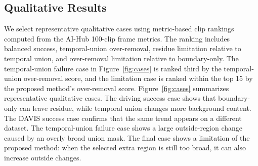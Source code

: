\documentclass[nouppercase]{kaia}
\begin{document}
\begin{table}[h]
\begin{center}
\end{center}
\caption{Computational cost and practicality. The proposed method is a training-free, model-agnostic preprocessing step and does not require depth, optical flow, or model modification at inference time.}
\label{tab:cost}
\end{table}

\subsection{Qualitative Results}
We select representative qualitative cases using metric-based clip rankings computed from the AI-Hub 100-clip frame metrics. The ranking includes balanced success, temporal-union over-removal, residue limitation relative to temporal union, and over-removal limitation relative to boundary-only. The temporal-union failure case in Figure~\ref{fig:cases} is ranked third by the temporal-union over-removal score, and the limitation case is ranked within the top 15 by the proposed method's over-removal score. Figure~\ref{fig:cases} summarizes representative qualitative cases. The driving success case shows that boundary-only can leave residue, while temporal union changes more background content. The DAVIS success case confirms that the same trend appears on a different dataset. The temporal-union failure case shows a large outside-region change caused by an overly broad union mask. The final case shows a limitation of the proposed method: when the selected extra region is still too broad, it can also increase outside changes.
\end{document}
